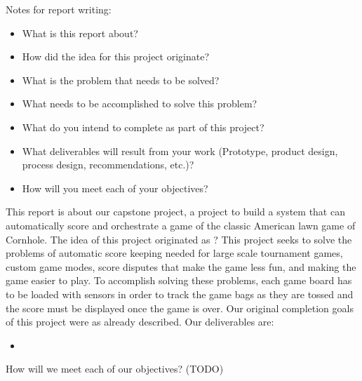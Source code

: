 \documentclass{article}
\begin{document}
Notes for report writing:
\begin{itemize}
    \item What is this report about? 
    \item How did the idea for this project originate?
    \item What is the problem that needs to be solved? 
    \item What needs to be accomplished to solve this problem? 
    \item What do you intend to complete as part of this project? 
    \item What  deliverables  will  result  from  your  work  (Prototype,  product  design,  process design, recommendations, etc.)?
    \item How will you meet each of your objectives? 
\end{itemize}

This report is about our capstone project, a project to build a system that can automatically score and orchestrate a game of the classic American lawn game of Cornhole. The idea of this project originated as ? This project seeks to solve the problems of automatic score keeping needed for large scale tournament games, custom game modes, score disputes that make the game less fun, and making the game easier to play. To accomplish solving these problems, each game board has to be loaded with sensors in order to track the game bags as they are tossed and the score must be displayed once the game is over. Our original completion goals of this project were as already described. Our deliverables are:
\begin{itemize}
    \item 
\end{itemize}

How will we meet each of our objectives? (TODO) 
\end{document}

